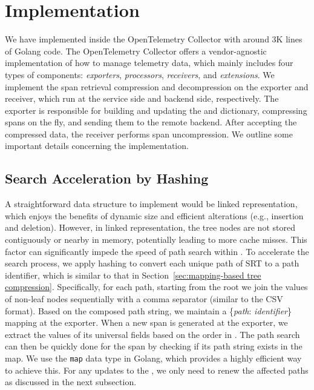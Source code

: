 \section{Implementation}
\label{sec:implementation}

We have implemented \alias inside the OpenTelemetry Collector with around 3K lines of Golang code.
The OpenTelemetry Collector offers a vendor-agnostic implementation of how to manage telemetry data, which mainly includes four types of components: \textit{exporters}, \textit{processors}, \textit{receivers}, and \textit{extensions}.
We implement the span retrieval compression and decompression on the exporter and receiver, which run at the service side and backend side, respectively.
The exporter is responsible for building and updating the \sname and dictionary, compressing spans on the fly, and sending them to the remote backend.
After accepting the compressed data, the receiver performs span uncompression.
We outline some important details concerning the implementation.

\subsection{Search Acceleration by Hashing}
\label{sec:hashing_acceleration}

A straightforward data structure to implement \sname would be linked representation, which enjoys the benefits of dynamic size and efficient alterations (e.g., insertion and deletion).
However, in linked representation, the tree nodes are not stored contiguously or nearby in memory, potentially leading to more cache misses.
This factor can significantly impede the speed of path search within \sname.
To accelerate the search process, we apply hashing to convert each unique path of SRT to a path identifier, which is similar to that in Section~\ref{sec:mapping-based tree compression}.
Specifically, for each path, starting from the root we join the values of non-leaf nodes sequentially with a comma separator (similar to the CSV format). 
Based on the composed path string, we maintain a \{\textit{path}: \textit{identifier}\} mapping at the exporter.
When a new span is generated at the exporter, we extract the values of its universal fields based on the order in \sname.
The path search can then be quickly done for the span by checking if its path string exists in the map.
We use the \texttt{map} data type in Golang, which provides a highly efficient way to achieve this.
For any updates to the \sname, we only need to renew the affected paths as discussed in the next subsection.

